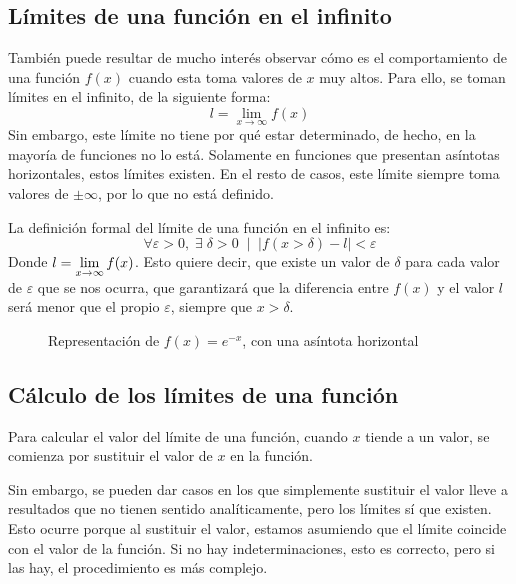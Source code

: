\documentclass[sans]{apuntes}
\begin{document}

\subsection{Límites de una función en el infinito}
También puede resultar de mucho interés observar cómo es el comportamiento de una función $f(x)$ cuando esta toma valores de $x$ muy altos. Para ello, se toman límites en el infinito, de la siguiente forma:
\[ l = \lim_{x \to \infty} f(x)\]
Sin embargo, este límite no tiene por qué estar determinado, de hecho, en la mayoría de funciones no lo está. Solamente en funciones que presentan asíntotas horizontales, estos límites existen. En el resto de casos, este límite siempre toma valores de $\pm \infty$, por lo que no está definido.
\par La definición formal del límite de una función en el infinito es:
\[\forall \varepsilon > 0,\; \exists \; \delta > 0\;\mid\;\left| f(x > \delta) - l\right| < \varepsilon\]
Donde $l = \displaystyle\lim_{x \to \infty}{f(x)}$. Esto quiere decir, que existe un valor de $\delta$ para cada valor de $\varepsilon$ que se nos ocurra, que garantizará que la diferencia entre $f(x)$ y el valor $l$ será menor que el propio $\varepsilon$, siempre que $x > \delta$.

\begin{figure}[ht]
	\centering
	\caption{Representación de $f(x) = e^{-x}$, con una asíntota horizontal}\label{fig:asintota-horiz}
\end{figure}

\subsection{Cálculo de los límites de una función}
Para calcular el valor del límite de una función, cuando $x$ tiende a un valor, se comienza por sustituir el valor de $x$ en la función.
\par Sin embargo, se pueden dar casos en los que simplemente sustituir el valor lleve a resultados que no tienen sentido analíticamente, pero los límites sí que existen. Esto ocurre porque al sustituir el valor, estamos asumiendo que el límite coincide con el valor de la función. Si no hay indeterminaciones, esto es correcto, pero si las hay, el procedimiento es más complejo.
\end{document}
